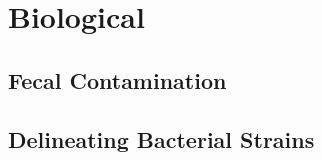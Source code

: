 \section{Biological}
\subsection{Fecal Contamination}
\subsection{\MSTlong{}}
\subsection{\FIBlong{}}
\subsection{Delineating Bacterial Strains}